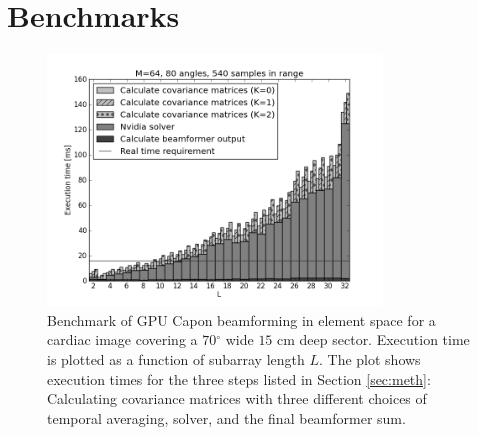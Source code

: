 \documentclass[journal]{IEEEtran}
\newcommand{\degree}{\ensuremath{^\circ}}
\begin{document}
\section{Benchmarks}\label{sec:bench}


\begin{figure}
\centerline{\includegraphics[width=3.5in]{gfx/benchmark_bar_64_80_540.png}}
\caption{Benchmark of GPU Capon beamforming in element space for a cardiac image covering a $70\degree$ wide $15$ cm deep sector. Execution time is plotted as a function of subarray length $L$. The plot shows execution times for the three steps listed in Section \ref{sec:meth}: Calculating covariance matrices with three different choices of temporal averaging, solver, and the final beamformer sum.}
\label{fig:bench}
\end{figure}
\end{document}
